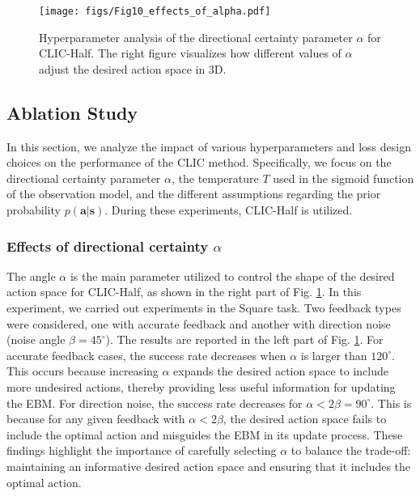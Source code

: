 \begin{figure}[t]
    \centering
    \texttt{[image: figs/Fig10\_effects\_of\_alpha.pdf]}
	\caption{Hyperparameter analysis of the directional certainty parameter 
$\alpha$ for CLIC-Half. The right figure visualizes how different values of 
$\alpha$ adjust the desired action space in 3D.}
 \label{fig:Fig10_effects_of_alpha}
\end{figure}


\subsection{Ablation Study}
\label{sec:exp:ablation}
In this section, we analyze the impact of various hyperparameters and loss design choices on the performance of the CLIC method.  Specifically, we focus on the directional certainty parameter $\alpha$, the temperature $T$ used in the sigmoid function of the observation model, and the different assumptions regarding the prior probability $p(\bm{a}|\bm{s})$.
During these experiments, CLIC-Half is utilized.


\subsubsection{Effects of directional certainty $\alpha$ }
The angle $\alpha$ is the main parameter utilized to control the shape of the desired action space for CLIC-Half, as shown in the right part of Fig. \ref{fig:Fig10_effects_of_alpha}.
In this experiment, we carried out experiments in the Square task. Two feedback types were considered, one with accurate feedback and another with direction noise (noise angle $\beta=45^{\circ}$). The results are reported in the left part of Fig. \ref{fig:Fig10_effects_of_alpha}.
For accurate feedback cases, the success rate decreases when $\alpha$ is larger than $120^\circ$. 
 This occurs because increasing $\alpha$ expands the desired action space to include more undesired actions, thereby providing less useful information for updating the EBM.
For direction noise, the success rate decreases for $\alpha < 2 \beta = 90^\circ$. 
This is because for any given feedback with $\alpha < 2 \beta$, the desired action space fails to include the optimal action and misguides the EBM in its update process.
These findings highlight the importance of carefully selecting $\alpha$ to balance the trade-off: maintaining an informative desired action space and ensuring that it includes the optimal action.

